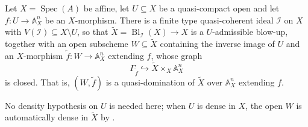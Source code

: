 \begin{lemma}
  \label{lemma:nagata-conrad-affine-space-extension}
  \leanok

  Let $X=\operatorname{Spec}(A)$ be affine, let $U\subseteq X$ be a
  quasi-compact open and let $f\colon U\to\mathbb A^n_X$ be an $X$-morphism.
  There is a finite type quasi-coherent ideal $\mathcal I$ on $X$ with
  $V(\mathcal I)\subseteq X\setminus U$, so that
  $\widetilde X=\operatorname{Bl}_{\mathcal I}(X)\to X$ is a $U$-admissible
  blow-up, together with an open subscheme $W\subseteq\widetilde X$ containing
  the inverse image of $U$ and an $X$-morphism
  $\widetilde f\colon W\to\mathbb A^n_X$ extending $f$, whose graph
  \[
    \Gamma_{\widetilde f}\hookrightarrow
      \widetilde X\times_X\mathbb A^n_X
  \]
  is closed.  That is, $(W,\widetilde f)$ is a quasi-domination of
  $\widetilde X$ over $\mathbb A^n_X$ extending $f$.

  No density hypothesis on $U$ is needed here; when $U$ is dense in $X$, the
  open $W$ is automatically dense in $\widetilde X$ by
  .
\end{lemma}

